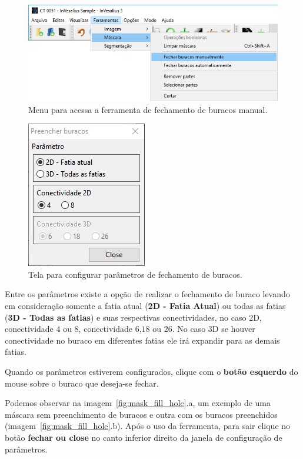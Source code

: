 \begin{figure}[!htb]
\centering
\includegraphics[scale=0.4]{../user_guide_figures/invesalius_screen/menu_mask_manual_fill_holes_pt.png}
\caption{Menu para acessa a ferramenta de fechamento de buracos manual.}
\label{fig:menu_mask_manual_fill_holes}
\end{figure}

\begin{figure}[!htb]
\centering
\includegraphics[scale=0.7]{../user_guide_figures/invesalius_screen/mask_manual_fill_holes_window_pt.png}
\caption{Tela para configurar parâmetros de fechamento de buracos.}
\label{fig:mask_manual_fill_holes_window}
\end{figure}

Entre os parâmetros existe a opção de realizar o fechamento de buraco levando em consideração somente a fatia atual (\textbf{2D - Fatia Atual}) ou todas as fatias (\textbf{3D - Todas as fatias}) e suas respectivas conectividades, no caso 2D, conectividade $4$ ou $8$, conectividade $6$,$18$ ou $26$. No caso 3D se houver conectividade no buraco em diferentes fatias ele irá expandir para as demais fatias.

Quando os parâmetros estiverem configurados, clique com o \textbf{botão esquerdo} do mouse sobre o buraco que deseja-se fechar.

Podemos observar na imagem~\ref{fig:mask_fill_hole}.a, um exemplo de uma máscara sem preenchimento de buracos e outra com os buracos preenchidos (imagem~\ref{fig:mask_fill_hole}.b). Após o uso da ferramenta, para sair clique no botão \textbf{fechar ou close} no canto inferior direito da janela de configuração de parâmetros.

